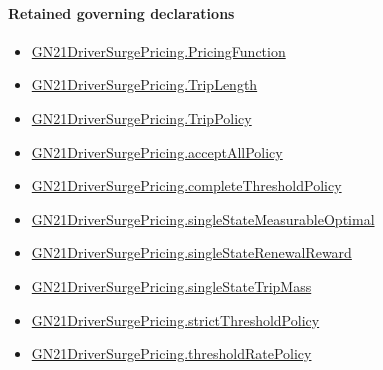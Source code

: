 \documentclass[10pt]{article}
\begin{document}
\paragraph{Retained governing declarations}
\begin{itemize}\raggedright
\item \hyperlink{governing-declaration-9ab0ab344da5df05}{GN21\allowbreak{}Driver\allowbreak{}Surge\allowbreak{}Pricing.\allowbreak{}Pricing\allowbreak{}Function}
\item \hyperlink{governing-declaration-a616c143f22cf2bc}{GN21\allowbreak{}Driver\allowbreak{}Surge\allowbreak{}Pricing.\allowbreak{}Trip\allowbreak{}Length}
\item \hyperlink{governing-declaration-4312ad4cb899871f}{GN21\allowbreak{}Driver\allowbreak{}Surge\allowbreak{}Pricing.\allowbreak{}Trip\allowbreak{}Policy}
\item \hyperlink{governing-declaration-e94c9281d4f4b12d}{GN21\allowbreak{}Driver\allowbreak{}Surge\allowbreak{}Pricing.\allowbreak{}accept\allowbreak{}All\allowbreak{}Policy}
\item \hyperlink{governing-declaration-9d53d2864d2eb216}{GN21\allowbreak{}Driver\allowbreak{}Surge\allowbreak{}Pricing.\allowbreak{}complete\allowbreak{}Threshold\allowbreak{}Policy}
\item \hyperlink{governing-declaration-19a00aa92f85cddf}{GN21\allowbreak{}Driver\allowbreak{}Surge\allowbreak{}Pricing.\allowbreak{}single\allowbreak{}State\allowbreak{}Measurable\allowbreak{}Optimal}
\item \hyperlink{governing-declaration-147334ebd6da0a3b}{GN21\allowbreak{}Driver\allowbreak{}Surge\allowbreak{}Pricing.\allowbreak{}single\allowbreak{}State\allowbreak{}Renewal\allowbreak{}Reward}
\item \hyperlink{governing-declaration-1c88cf5996e161d3}{GN21\allowbreak{}Driver\allowbreak{}Surge\allowbreak{}Pricing.\allowbreak{}single\allowbreak{}State\allowbreak{}Trip\allowbreak{}Mass}
\item \hyperlink{governing-declaration-a94d4ea2f01118ad}{GN21\allowbreak{}Driver\allowbreak{}Surge\allowbreak{}Pricing.\allowbreak{}strict\allowbreak{}Threshold\allowbreak{}Policy}
\item \hyperlink{governing-declaration-5a482c9835ed613f}{GN21\allowbreak{}Driver\allowbreak{}Surge\allowbreak{}Pricing.\allowbreak{}threshold\allowbreak{}Rate\allowbreak{}Policy}
\end{itemize}
\end{document}

